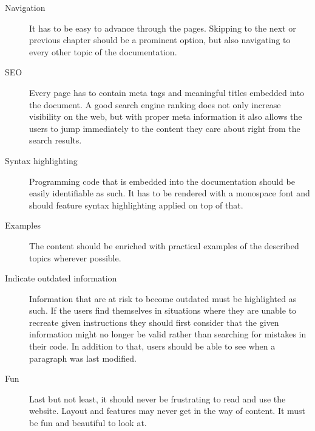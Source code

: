 \begin{description}
	\item[Navigation]\hfill

	It has to be easy to advance through the pages. Skipping to the next or previous chapter should be a prominent option, but also navigating to every other topic of the documentation.

	\item[SEO]\hfill

	Every page has to contain meta tags and meaningful titles embedded into the document. A good search engine ranking does not only increase visibility on the web, but with proper meta information it also allows the users to jump immediately to the content they care about right from the search results.

	\item[Syntax highlighting]\hfill

	Programming code that is embedded into the documentation should be easily identifiable as such. It has to be rendered with a monospace font and should feature syntax highlighting applied on top of that.

	\item[Examples]\hfill

	The content should be enriched with practical examples of the described topics wherever possible.

	\item[Indicate outdated information]\hfill

	Information that are at risk to become outdated must be highlighted as such. If the users find themselves in situations where they are unable to recreate given instructions they should first consider that the given information might no longer be valid rather than searching for mistakes in their code. In addition to that, users should be able to see when a paragraph was last modified.

	\item[Fun]\hfill

	Last but not least, it should never be frustrating to read and use the website. Layout and features may never get in the way of content. It must be fun and beautiful to look at.

\end{description}